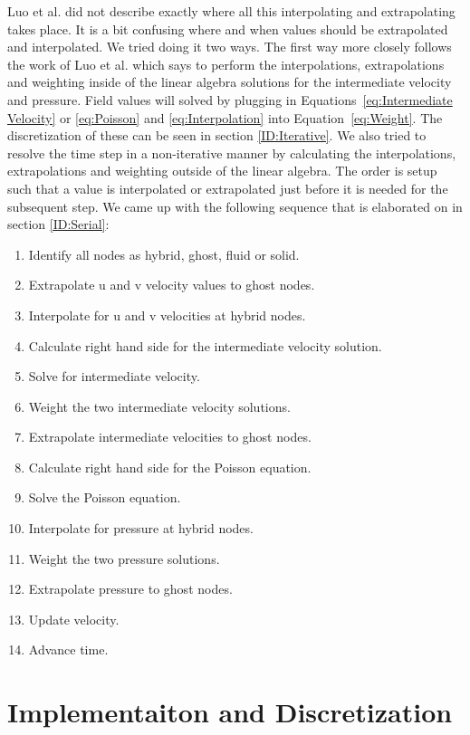 \documentclass[onehalf,11pt]{beavtex}
\begin{document}
Luo et al. did not describe exactly where all this interpolating and extrapolating takes place.
It is a bit confusing where and when values should be extrapolated and interpolated.
We tried doing it two ways.
The first way more closely follows the work of Luo et al.\cite{Luo:2012gx} which says to perform the interpolations, extrapolations and weighting inside of the linear algebra solutions for the intermediate velocity and pressure. 
Field values will solved by plugging in Equations~\eqref{eq:Intermediate Velocity} or \eqref{eq:Poisson} and \eqref{eq:Interpolation} into Equation~\eqref{eq:Weight}. 
The discretization of these can be seen in section \ref{ID:Iterative}.
We also tried to resolve the time step in a non-iterative manner by calculating the interpolations, extrapolations and weighting outside of the linear algebra. 
The order is setup such that a value is interpolated or extrapolated just before it is needed for the subsequent step.
We came up with the following sequence that is elaborated on in section \ref{ID:Serial}:
\begin{enumerate}
	\item Identify all nodes as hybrid, ghost, fluid or solid.
	\item Extrapolate u and v velocity values to ghost nodes.
	\item Interpolate for u and v velocities at hybrid nodes.
	\item Calculate right hand side for the intermediate velocity solution.
	\item Solve for intermediate velocity.
	\item Weight the two intermediate velocity solutions.
	\item Extrapolate intermediate velocities to ghost nodes.
	\item Calculate right hand side for the Poisson equation.
	\item Solve the Poisson equation.
	\item Interpolate for pressure at hybrid nodes.
	\item Weight the two pressure solutions.
	\item Extrapolate pressure to ghost nodes.
	\item Update velocity.
	\item Advance time.
\end{enumerate}

\chapter{Implementaiton and Discretization}\label{Implementation}
\end{document}
